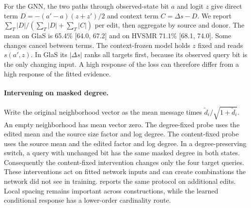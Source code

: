 \documentclass[10pt,twocolumn,letterpaper]{article}
\begin{document}
For the GNN, the two paths through observed-state bit $a$ and logit $z$ give direct term $D=-(a'-a)(z+z')/2$ and context term $C=\Delta s-D$. We report $\sum_T|D|/(\sum_T|D|+\sum_T|C|)$ per edit, then aggregate by source and donor. The mean on GlaS is 65.4\% [64.0, 67.2] and on HVSMR 71.1\% [68.1, 74.0]. Some changes cancel between terms. The context-frozen model holds $z$ fixed and reads $s(a',z)$. In GlaS its $|\Delta s|$ ranks all targets first, because its observed query bit is the only changing input. A high response of the loss can therefore differ from a high response of the fitted evidence.

\begin{table}[t]
\centering
\caption{\textbf{Matched switch sensitivity, direction, and collateral.} $T$ denotes the four targets and $U$ untouched pairs. AUROCs, moved fractions and directional wins are percentages. $W_+$ and $W_-$ summarize additions and removals. The last five columns use development IQR units and report signed mean target shift and absolute shift percentiles. Each percentile is first taken within an edit. The matched scope has 78 fields from 12 gland donors and 59 scans from 59 cardiac donors. Full paired intervals and raw pair scores are retained in the reproducibility data.}
\label{tab:shifts}
\scriptsize
\setlength{\tabcolsep}{2.8pt}

\end{table}

\paragraph{Intervening on masked degree.}
Write the original neighborhood vector as the mean message times $\tilde d_i/\sqrt{1+\tilde d_i}$. An empty neighborhood has mean vector zero. The degree-fixed probe uses the edited mean and the source size factor and log degree. The content-fixed probe uses the source mean and the edited factor and log degree. In a degree-preserving switch, a query with unchanged bit has the same masked degree in both states. Consequently the content-fixed intervention changes only the four target queries. These interventions act on fitted network inputs and can create combinations the network did not see in training.  reports the same protocol on additional edits. Local spacing remains important across constructions, while the learned conditional response has a lower-order cardinality route.

\begin{table}[t]
\centering
\caption{\textbf{Degree intervention on the fitted GNN.} Response ranks absolute changes in probability. Paired 95\% intervals are shown. Repeated edits reuse the original donors.}
\label{tab:degree}
\scriptsize

\end{table}
\end{document}
